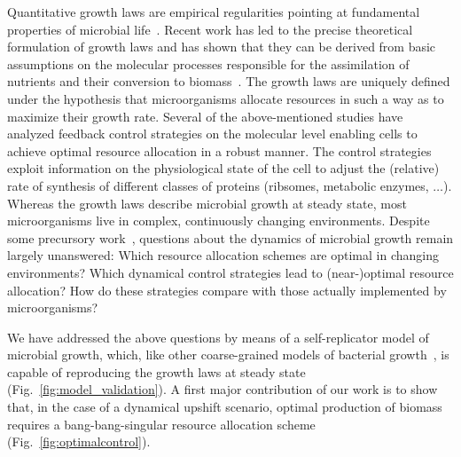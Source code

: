 Quantitative growth laws are empirical regularities pointing at fundamental properties of microbial life~\cite{scott_bacterial_2011}.
Recent work has led to the precise theoretical formulation of growth laws and has shown that they can be derived from basic assumptions on the molecular processes responsible for the assimilation of nutrients and their conversion to biomass~\cite{bosdriesz_how_2015,maitra_bacterial_2014,molenaar_shifts_2009,scott_emergence_2014,weisse_mechanistic_2015}.
The growth laws are uniquely defined under the hypothesis that microorganisms allocate resources in such a way as to maximize their growth rate.
Several of the above-mentioned studies have analyzed feedback control strategies on the molecular level enabling cells to achieve optimal resource allocation in a robust manner.
The control strategies exploit information on the physiological state of the cell to adjust the (relative) rate of synthesis of different classes of proteins (ribsomes, metabolic enzymes, $\ldots$).
Whereas the growth laws describe microbial growth at steady state, most microorganisms live in complex, continuously changing environments.
Despite some precursory work~\cite{pavlov_optimal_2013,vandenberg_optimal_1998}, questions about the dynamics of microbial growth remain largely unanswered:
Which resource allocation schemes are optimal in changing environments? Which dynamical control strategies lead to (near-)optimal resource allocation? How do these strategies compare with those actually implemented by microorganisms? 

We have addressed the above questions by means of a self-replicator model of microbial growth, which, like other coarse-grained models of bacterial growth~\cite{maitra_bacterial_2014,molenaar_shifts_2009,scott_emergence_2014}, is capable of reproducing the growth laws at steady state (Fig.~\ref{fig:model_validation}).
A first major contribution of our work is to show that, in the case of a dynamical upshift scenario, optimal production of biomass requires a bang-bang-singular resource allocation scheme (Fig.~\ref{fig:optimalcontrol}).

